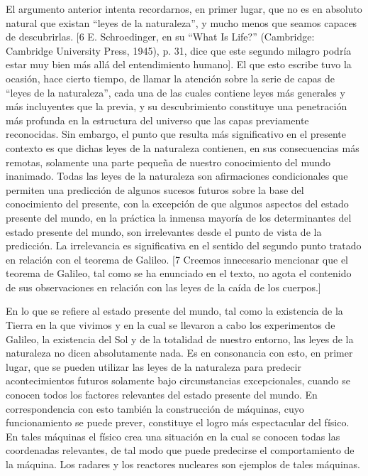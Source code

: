 \documentclass[a4paper, 12pt]{article}
\begin{document}
El argumento anterior intenta recordarnos, en primer lugar, que no es en absoluto natural que existan ``leyes de la naturaleza'', y mucho menos que seamos capaces de descubrirlas. [6 E. Schroedinger, en su ``What Is Life?'' (Cambridge: Cambridge University Press, 1945), p. 31, dice que este segundo milagro podría estar muy bien más allá del entendimiento humano]. El que esto escribe tuvo la ocasión, hace cierto tiempo, de llamar la atención sobre la serie de capas de ``leyes de la naturaleza'', cada una de las cuales contiene leyes más generales y más incluyentes que la previa, y su descubrimiento constituye una penetración más profunda en la estructura del universo que las capas previamente reconocidas. Sin embargo, el punto que resulta más significativo en el presente contexto es que dichas leyes de la naturaleza contienen, en sus consecuencias más remotas, solamente una parte pequeña de nuestro conocimiento del mundo inanimado. Todas las leyes de la naturaleza son afirmaciones condicionales que permiten una predicción de algunos sucesos futuros sobre la base del conocimiento del presente, con la excepción de que algunos aspectos del estado presente del mundo, en la práctica la inmensa mayoría de los determinantes del estado presente del mundo, son irrelevantes desde el punto de vista de la predicción. La irrelevancia es significativa en el sentido del segundo punto tratado en relación con el teorema de Galileo.  [7 Creemos innecesario mencionar que el teorema de Galileo, tal como se ha enunciado en el texto, no agota el contenido de sus observaciones en relación con las leyes de la caída de los cuerpos.]



En lo que se refiere al estado presente del mundo, tal como la existencia de la Tierra en la que vivimos y en la cual se llevaron a cabo los experimentos de Galileo, la existencia del Sol y de la totalidad de nuestro entorno, las leyes de la naturaleza no dicen absolutamente nada. Es en consonancia con esto, en primer lugar, que se pueden utilizar las leyes de la naturaleza para predecir acontecimientos futuros solamente bajo circunstancias excepcionales, cuando se conocen todos los factores relevantes del estado presente del mundo. En correspondencia con esto también la construcción de máquinas, cuyo funcionamiento se puede prever, constituye el logro más espectacular del físico. En tales máquinas el físico crea una situación en la cual se conocen todas las coordenadas relevantes, de tal modo que puede predecirse el comportamiento de la máquina. Los radares y los reactores nucleares son ejemplos de tales máquinas.
\end{document}
